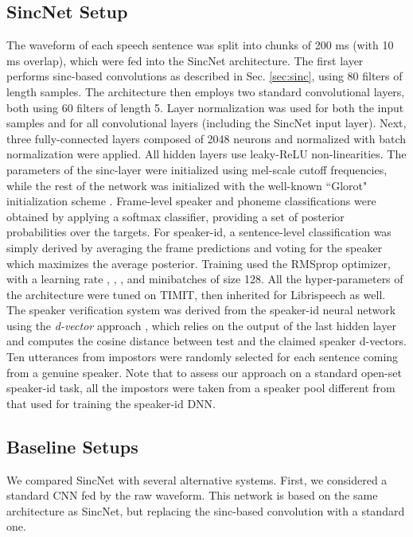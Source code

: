 \documentclass{article}
\begin{document}
\subsection*{SincNet Setup}
The waveform of each speech sentence was split into chunks of 200 ms (with 10 ms overlap), which were fed into the SincNet architecture. The first layer performs sinc-based convolutions as described in Sec. \ref{sec:sinc}, using 80 filters of length  samples. The architecture then employs two standard convolutional layers, both using 60 filters of length 5. Layer normalization \cite{layer_norm} was used for both the input samples and for all convolutional layers (including the SincNet input layer). Next, three fully-connected layers composed of 2048 neurons and normalized with batch normalization \cite{batchnorm,ravanelli_SLT} were applied. All hidden layers use leaky-ReLU \cite{leaky_relu} non-linearities. The parameters of the sinc-layer were initialized using mel-scale cutoff frequencies, while the rest of the network was initialized with the well-known ``Glorot" initialization scheme \cite{xavier}. Frame-level speaker and phoneme classifications were obtained by applying a softmax classifier, providing a set of posterior probabilities over the targets. For speaker-id, a sentence-level classification was simply derived by averaging the frame predictions and voting for the speaker which maximizes the average posterior.
Training used the RMSprop optimizer, with a learning rate , , , and minibatches of size 128. All the hyper-parameters of the architecture were tuned on TIMIT, then inherited for Librispeech as well. The speaker verification system was derived from the speaker-id neural network using the \textit{d-vector} approach \cite{dnn_spk_rec_class2,voxceleb}, which relies on the output of the last hidden layer and computes the cosine  distance between test and the claimed speaker d-vectors. 
Ten utterances from impostors were randomly selected for each sentence coming from a genuine speaker. Note that to assess our approach on a standard open-set speaker-id task, all the impostors were taken from a speaker pool different from that used for training the speaker-id DNN.


 
\subsection*{Baseline Setups}
We compared SincNet with several alternative systems. 
First, we considered a standard CNN fed by the raw waveform. This network is based on the same architecture as SincNet, but replacing the sinc-based convolution with a standard one. 
\end{document}
